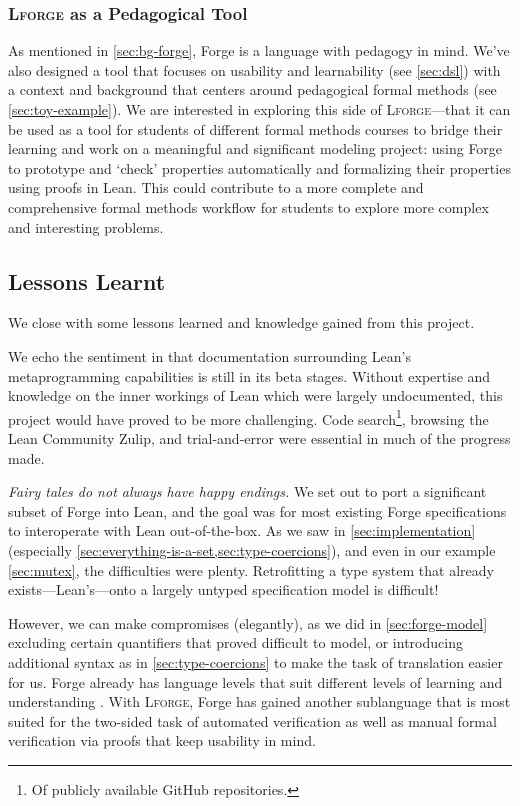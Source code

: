 \subsubsection{\textsc{Lforge} as a Pedagogical Tool}

As mentioned in \cref{sec:bg-forge}, Forge is a language with pedagogy in mind. We've also designed a tool that focuses on usability and learnability (see \cref{sec:dsl}) with a context and background that centers around pedagogical formal methods (see \cref{sec:toy-example}). We are interested in exploring this side of \textsc{Lforge}---that it can be used as a tool for students of different formal methods courses to bridge their learning and work on a meaningful and significant modeling project: using Forge to prototype and `check' properties automatically and formalizing their properties using proofs in Lean. This could contribute to a more complete and comprehensive formal methods workflow for students to explore more complex and interesting problems. 

\subsection{Lessons Learnt}

We close with some lessons learned and knowledge gained from this project. 

We echo the sentiment in \cite{gladshtein2024small} that documentation surrounding Lean's metaprogramming capabilities is still in its beta stages. Without expertise and knowledge on the inner workings of Lean which were largely undocumented, this project would have proved to be more challenging. Code search\footnote{Of publicly available GitHub repositories.}, browsing the Lean Community Zulip, and trial-and-error were essential in much of the progress made. 

\emph{Fairy tales do not always have happy endings.} We set out to port a significant subset of Forge into Lean, and the goal was for most existing Forge specifications to interoperate with Lean out-of-the-box. As we saw in \cref{sec:implementation} (especially \cref{sec:everything-is-a-set,sec:type-coercions}), and even in our example \cref{sec:mutex}, the difficulties were plenty. Retrofitting a type system that already exists---Lean's---onto a largely untyped specification model is difficult! 

However, we can make compromises (elegantly), as we did in \cref{sec:forge-model} excluding certain quantifiers that proved difficult to model, or introducing additional syntax as in \cref{sec:type-coercions} to make the task of translation easier for us. Forge already has language levels that suit different levels of learning and understanding \cite{ngpdbccdlrrvwwk-oopsla-2024}. With \textsc{Lforge}, Forge has gained another sublanguage that is most suited for the two-sided task of automated verification as well as manual formal verification via proofs that keep usability in mind. 
